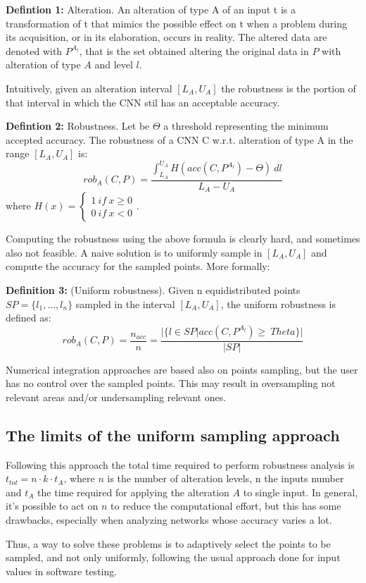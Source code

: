 \textbf{Defintion 1:} Alteration. An alteration of type A of an input
t is a transformation of t that mimics the possible effect on
t when a problem during its acquisition, or in its elaboration,
occurs in reality. The altered data are denoted with $P^{A_l}$, that is the set obtained altering the original data in $P$ with alteration of type $A$ and level $l$.

Intuitively, given an alteration interval $[L_A, U_A]$ the robustness is the portion of that interval in which the CNN stil has an acceptable accuracy.

\textbf{Defintion 2:} Robustness. Let be $\Theta$ a threshold representing
the minimum accepted accuracy. The robustness of a CNN C
w.r.t. alteration of type A in the range $[L_A, U_A]$ is:
\[
	rob_A(C,P) = \frac{\int_{L_A}^{U_A} H(acc(C,P^{A_l}) - \Theta)\ dl}{L_A - U_A}
\]
where $H(x) = \begin{cases}
	1 \ if \ x \geq 0 \\
	0 \ if \ x < 0
\end{cases}$.

Computing the robustness using the above formula is clearly hard, and sometimes also not feasible. A naive solution is to uniformly sample in $[L_A, U_A]$ and compute the accuracy for the sampled points. More formally:

\textbf{Definition 3:} (Uniform robustness). Given n equidistributed
points $SP = \{l_1, ...,l_n\}$ sampled in the interval $[L_A, U_A]$, the uniform robustness is defined as:
\[
	rob_A(C,P) = \frac{n_{acc}}{n} = \frac{| \{l \in SP | acc(C,P^{A_l}) \geq \ Theta\} |}{|SP|}
\]

Numerical integration approaches are based also on points sampling, but the user has no control over the sampled points. This may result in oversampling
not relevant areas and/or undersampling relevant ones.

\subsection{The limits of the uniform sampling approach}

Following this approach the total time required to
perform robustness analysis is $t_{tot} = n \cdot k \cdot t_A$, where $n$ is the number of alteration levels, n the inputs number and $t_A$ the time required for applying the alteration $A$ to single input. In general, it's possible to act on $n$ to reduce the computational effort, but this has some drawbacks, especially when analyzing networks whose accuracy varies a lot.

Thus, a way to solve these problems is to adaptively select the points to be sampled, and not only uniformly, following the usual approach done for input values in software testing.